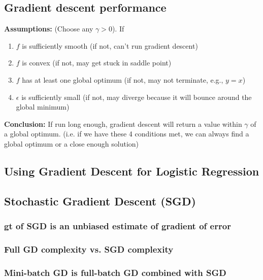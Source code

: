\subsection{Gradient descent performance}
\begin{theorem}

    \textbf{Assumptions:} (Choose any $\gamma > 0$). If
    \begin{enumerate}
        \item $f$ is sufficiently smooth (if not, can't run gradient descent)
        \item $f$ is convex (if not, may get stuck in saddle point)
        \item $f$ has at least one global optimum (if not, may not terminate, e.g., $y=x$)
        \item $\epsilon$ is sufficiently small (if not, may diverge because it will bounce around the global minimum)
    \end{enumerate}

    \textbf{Conclusion:} If run long enough, gradient descent will return a value within $\gamma$ of a global optimum. (i.e. if we have these 4 conditions met, we can always find a global optimum or a close enough solution)

\end{theorem}

\subsection{Using Gradient Descent for Logistic Regression}

\subsection{Stochastic Gradient Descent (SGD)}

    \subsubsection{gt of SGD is an unbiased estimate of gradient of error}

    \subsubsection{Full GD complexity vs. SGD complexity}

    \subsubsection{Mini-batch GD is full-batch GD combined with SGD}

